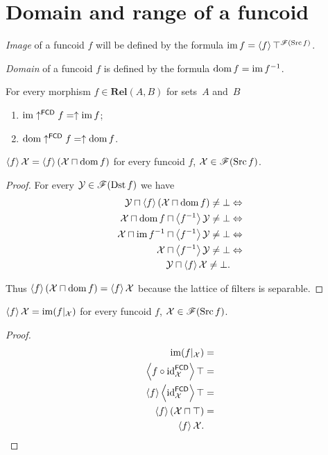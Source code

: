 \section{Domain and range of a funcoid}
\begin{defn}
\emph{Image} of a funcoid $f$ will be defined
by the formula $\operatorname{im} f=\left\langle f\right\rangle\top^{\mathscr{F}(\operatorname{Src} f)}$.

\emph{Domain} of a funcoid $f$ is defined
by the formula $\operatorname{dom} f=\operatorname{im} f^{-1}$.\end{defn}
\begin{obvious}
For every morphism $f\in\mathbf{Rel}(A,B)$ for sets~$A$ and~$B$
\begin{enumerate}
\item $\operatorname{im}\uparrow^{\mathsf{FCD}}f=\uparrow\operatorname{im} f$;
\item $\operatorname{dom}\uparrow^{\mathsf{FCD}}f=\uparrow\operatorname{dom} f$.
\end{enumerate}
\end{obvious}
\begin{prop}
$\left\langle f\right\rangle\mathcal{X}=\left\langle f\right\rangle(\mathcal{X}\sqcap\operatorname{dom} f)$ for every
funcoid $f$, $\mathcal{X}\in\mathscr{F}(\operatorname{Src} f)$.\end{prop}
\begin{proof}
For every $\mathcal{Y}\in\mathscr{F}(\operatorname{Dst} f)$ we have
\begin{align*}
\mathcal{Y}\sqcap\left\langle f\right\rangle(\mathcal{X}\sqcap\operatorname{dom} f)\ne\bot
& \Leftrightarrow\\
\mathcal{X}\sqcap\operatorname{dom} f\sqcap\left\langle f^{-1}\right\rangle\mathcal{Y}\ne\bot & \Leftrightarrow\\
\mathcal{X}\sqcap\operatorname{im}
f^{-1}\sqcap\left\langle f^{-1}\right\rangle\mathcal{Y}\ne\bot &
\Leftrightarrow\\
\mathcal{X}\sqcap\left\langle f^{-1}\right\rangle\mathcal{Y}\ne\bot &
\Leftrightarrow\\
\mathcal{Y}\sqcap\left\langle f\right\rangle\mathcal{X}\ne\bot.
\end{align*}


Thus $\left\langle f\right\rangle(\mathcal{X}\sqcap\operatorname{dom} f)=\left\langle f\right\rangle\mathcal{X}$ because
the lattice of filters is separable.\end{proof}
\begin{prop}
$\left\langle f\right\rangle\mathcal{X}=\operatorname{im}(f|_{\mathcal{X}})$ for every funcoid $f$,
$\mathcal{X}\in\mathscr{F}(\operatorname{Src} f)$.\end{prop}
\begin{proof}
~
\begin{align*}
\operatorname{im}(f|_{\mathcal{X}}) & =\\
\left\langle f\circ\operatorname{id}_{\mathcal{X}}^{\mathsf{FCD}}\right\rangle\top & =\\
\left\langle f\right\rangle\left\langle \operatorname{id}_{\mathcal{X}}^{\mathsf{FCD}}\right\rangle\top &
=\\
\left\langle f\right\rangle(\mathcal{X}\sqcap\top) & =\\
\left\langle f\right\rangle\mathcal{X}.
\end{align*}
\end{proof}
